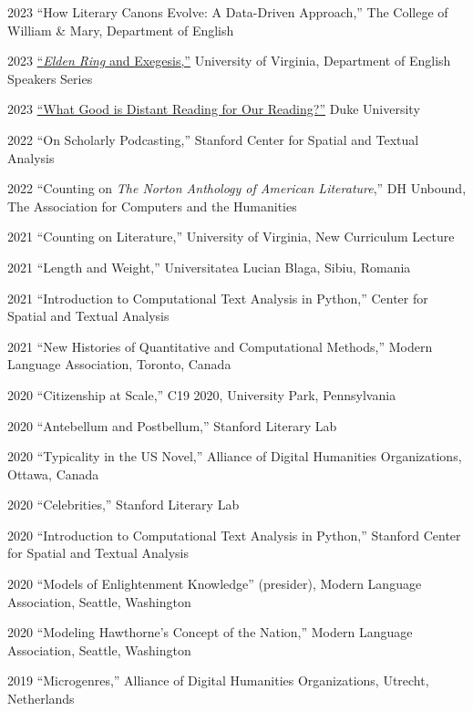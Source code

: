 \documentclass[12pt,letterpaper]{report}
\begin{document}
\begin{tablist}
	\item[2023] \tab{}\enquote{How Literary Canons Evolve: A Data-Driven Approach,} The College of William \& Mary, Department of English
	\item[2023] \tab{}\href{https://fredner.org/er/}{\enquote{\emph{Elden Ring} and Exegesis,}} University of Virginia, Department of English Speakers Series
	\item[2023] \tab{}\href{https://fredner.org/duke/}{\enquote{What Good is Distant Reading for Our Reading?}} Duke University
	\item[2022] \tab{}\enquote{On Scholarly Podcasting,} Stanford Center for Spatial and Textual Analysis
	\item[2022] \tab{}\enquote{Counting on \emph{The Norton Anthology of American Literature},} DH Unbound, The Association for Computers and the Humanities
	\item[2021] \tab{}\enquote{Counting on Literature,} University of Virginia, New Curriculum Lecture
	\item[2021] \tab{}\enquote{Length and Weight,} Universitatea Lucian Blaga, Sibiu, Romania
	\item[2021] \tab{}\enquote{Introduction to Computational Text Analysis in Python,} Center for Spatial and Textual Analysis
	\item[2021] \tab{}\enquote{New Histories of Quantitative and Computational Methods,} Modern Language Association, Toronto, Canada
	\item[2020] \tab{}\enquote{Citizenship at Scale,} C19 2020, University Park, Pennsylvania
	\item[2020] \tab{}\enquote{Antebellum and Postbellum,} Stanford Literary Lab
	\item[2020] \tab{}\enquote{Typicality in the US Novel,} Alliance of Digital Humanities Organizations, Ottawa, Canada
	\item[2020] \tab{}\enquote{Celebrities,} Stanford Literary Lab
	\item[2020] \tab{}\enquote{Introduction to Computational Text Analysis in Python,} Stanford Center for Spatial and Textual Analysis
	\item[2020] \tab{}\enquote{Models of Enlightenment Knowledge} (presider), Modern Language Association, Seattle, Washington
	\item[2020] \tab{}\enquote{Modeling Hawthorne's Concept of the Nation,} Modern Language Association, Seattle, Washington
	\item[2019] \tab{}\enquote{Microgenres,} Alliance of Digital Humanities Organizations, Utrecht, Netherlands

\end{tablist}
\end{document}
